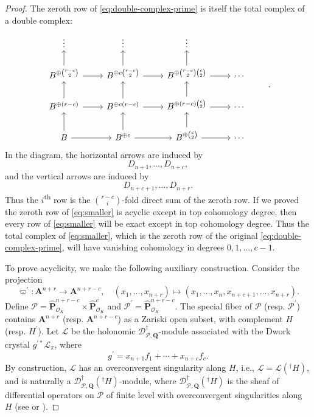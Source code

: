 \documentclass{amsart}
\numberwithin{equation}{section}
\theoremstyle{plain}
\theoremstyle{definition}
\renewcommand{\mathbb}{\mathbf}
\begin{document}
\begin{proof}
The zeroth row of \eqref{eq:double-complex-prime} is itself the total
complex of a double complex:
\begin{equation}\label{eq:smaller}
\begin{tikzcd}
\vdots & \vdots & \vdots \\
B^{\oplus \binom{r-c}{2}} \ar{r} \ar{u} & B^{\oplus c\binom{r-c}{2}} \ar{r} \ar{u} & B^{\oplus\binom{r-c}{2}\binom{c}{2}} \ar{r}\ar{u} &\cdots \\
B^{\oplus (r-c)} \ar{r} \ar{u} & B^{\oplus c(r-c)} \ar{r}\ar{u} & B^{\oplus(r-c)\binom{c}{2}} \ar{r} \ar{u} &\cdots & \\
B \ar{r} \ar{u} & B^{\oplus c} \ar{r} \ar{u} & B^{\oplus \binom{c}{2}} \ar{r} \ar{u} & \cdots
\end{tikzcd}.
\end{equation}
In the diagram, the horizontal arrows are induced by
\begin{equation*}
D_{n+1},\ldots, D_{n+c},
\end{equation*}
and the vertical arrows are induced by
\begin{equation*}
D_{n+c+1},\ldots, D_{n+r}.
\end{equation*}
Thus the \(i\)\textsuperscript{th} row is the \(\binom{r-c}{i}\)-fold
direct sum of the zeroth row.  If we proved the zeroth row of
\eqref{eq:smaller} is acyclic except in top cohomology degree, then
every row of \eqref{eq:smaller} will be exact except in top cohomology
degree.  Thus the total complex of \eqref{eq:smaller}, which is the
zeroth row of the original \eqref{eq:double-complex-prime}, will have
vanishing cohomology in degrees \(0,1,\ldots,c-1\).


\medskip%
To prove acyclicity, we make the following auxiliary construction.
Consider the projection
\[
\varpi^{\prime}\colon \mathbb{A}^{n+r} \to \mathbb{A}^{n+r-c}, \quad (x_{1}, \ldots, x_{n+r}) \mapsto (x_{1}, \ldots, x_{n}, x_{n+c+1}, \ldots, x_{n+r}).
\]
Define
\(\mathcal{P} = \widehat{\mathbb{P}}^{n+r-c}_{\mathcal{O}_{K}} \times \widehat{\mathbb{P}}^{c}_{\mathcal{O}_{K}}\)
and
\(\mathcal{P}^{\prime} = \widehat{\mathbb{P}}^{n+r-c}_{\mathcal{O}_{K}}\).
The special fiber of \(\mathcal{P}\) (resp. \(\mathcal{P}^{\prime}\))
contains \(\mathbb{A}^{n+r}\) (resp. \(\mathbb{A}^{n+r-c}\)) as a
Zariski open subset, with complement \(H\) (resp. \(H^{\prime}\)).
Let \(\mathcal{L}\) be the holonomic
\(\mathscr{D}^{\dagger}_{\mathcal{P}, \mathbb{Q}}\)-module associated
with the Dwork crystal \(g^{\prime\ast}\mathcal{L}_{\pi}\), where
\[
g^{\prime} = x_{n+1} f_{1} + \cdots + x_{n+c} f_{c}.
\]
By construction, \(\mathcal{L}\) has an overconvergent singularity
along \(H\), i.e., \(\mathcal{L} = \mathcal{L}({}^{\dagger}H)\), and
is naturally a
\(\mathscr{D}^{\dagger}_{\mathcal{P},\mathbb{Q}}({}^{\dagger}H)\)-module,
where
\(\mathscr{D}^{\dagger}_{\mathcal{P},\mathbb{Q}}({}^{\dagger}H)\) is
the sheaf of differential operators on \(\mathcal{P}\) of finite level
with overconvergent singularities along \(H\)
(see \cite[\S4.2.5]{berthelot:arithmetic-d-modules-1-differential-operators-of-finite-level} or
\cite[\S2.5]{baldassarri-berthelot:dwork-cohomology-for-singular-hypersurfaces}).


\end{proof}
\end{document}

